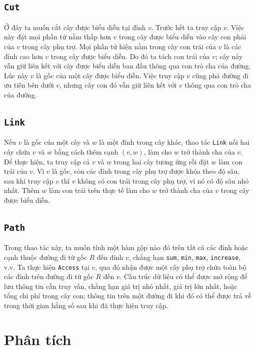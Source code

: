 \documentclass[11pt]{article}
\begin{document}
\subsection{\texttt{Cut}}

Ở đây ta muốn cắt cây được biểu diễn tại đỉnh $v$. Trước hết ta truy cập $v$.
Việc này đặt mọi phần tử nằm thấp hơn $v$ trong cây được biểu diễn vào cây con
phải của $v$ trong cây phụ trợ. Mọi phần tử hiện nằm trong cây con trái của
$v$ là các đỉnh cao hơn $v$ trong cây được biểu diễn. Do đó ta tách con trái
của $v$; cây này vẫn giữ liên kết với cây được biểu diễn ban đầu thông qua con
trỏ cha của đường. Lúc này $v$ là gốc của một cây được biểu diễn. Việc truy cập
$v$ cũng phá đường đi ưu tiên bên dưới $v$, nhưng cây con đó vẫn giữ liên kết
với $v$ thông qua con trỏ cha của đường.

\subsection{\texttt{Link}}

Nếu $v$ là gốc của một cây và $w$ là một đỉnh trong cây khác, thao tác
\texttt{Link} nối hai cây chứa $v$ và $w$ bằng cách thêm cạnh $(v,w)$, làm cho
$w$ trở thành cha của $v$. Để thực hiện, ta truy cập cả $v$ và $w$ trong hai
cây tương ứng rồi đặt $w$ làm con trái của $v$. Vì $v$ là gốc, còn các đỉnh
trong cây phụ trợ được khóa theo độ sâu, sau khi truy cập $v$ thì $v$ không có
con trái trong cây phụ trợ, vì nó có độ sâu nhỏ nhất. Thêm $w$ làm con trái
trên thực tế làm cho $w$ trở thành cha của $v$ trong cây được biểu diễn.

\subsection{\texttt{Path}}

Trong thao tác này, ta muốn tính một hàm gộp nào đó trên tất cả các đỉnh hoặc
cạnh thuộc đường đi từ gốc $R$ đến đỉnh $v$, chẳng hạn \texttt{sum},
\texttt{min}, \texttt{max}, \texttt{increase}, v.v. Ta thực hiện
\texttt{Access} tại $v$, qua đó nhận được một cây phụ trợ chứa toàn bộ các
đỉnh trên đường đi từ gốc $R$ đến $v$. Cấu trúc dữ liệu có thể được mở rộng để
lưu thông tin cần truy vấn, chẳng hạn giá trị nhỏ nhất, giá trị lớn nhất, hoặc
tổng chi phí trong cây con; thông tin trên một đường đi khi đó có thể được trả
về trong thời gian hằng số sau khi đã thực hiện truy cập.

\section{Phân tích}
\end{document}
